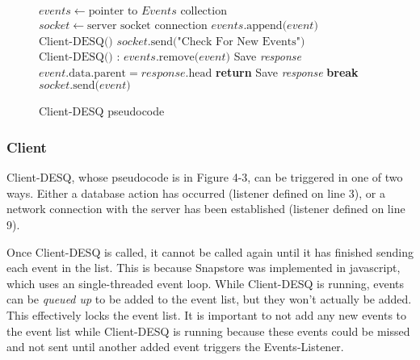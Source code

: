 \begin{center}
\begin{figure}[ht]
\begin{algorithmic}[1]
\State $events \gets \text{pointer to }Events \text{ collection}$
\State $socket \gets \text{server socket connection}$
\State $events\text{.append(}event\text{)}$
\EndWhile
\EndFunction
{}
\State $\text{Client-DESQ()}$
\EndWhile
\EndFunction
{}
\State $socket\text{.send("Check For New Events")}$
\State $\text{Client-DESQ()}$
\EndWhile
\EndFunction
{}
:
\State $events\text{.remove(}event\text{)}$
 
\State Save \emph{response} 
\State $event\text{.data.parent} = response\text{.head}$
\EndIf
\Else {}
\State \textbf{return}
\EndIf
\State Save \emph{response}
\EndIf
\EndWhile
\EndFunction
{}
\State \textbf{break}
\EndIf
\State $socket\text{.send(}event\text{)}$
\EndFor
\EndProcedure
\end{algorithmic}
\caption{Client-DESQ pseudocode}\label{euclid}
\end{figure}
\end{center}

\subsubsection{Client}

Client-DESQ, whose pseudocode is in Figure 4-3, can be triggered in one of two ways. Either a database action has occurred (listener defined on line 3), or a network connection with the server has been established (listener defined on line 9). 

Once Client-DESQ is called, it cannot be called again until it has finished sending each event in the list. This is because Snapstore was implemented in javascript, which uses an single-threaded event loop. While Client-DESQ is running, events can be \textit{queued up} to be added to the event list, but they won't actually be added. This effectively locks the event list. It is important to not add any new events to the event list while Client-DESQ is running because these events could be missed and not sent until another added event triggers the Events-Listener.

